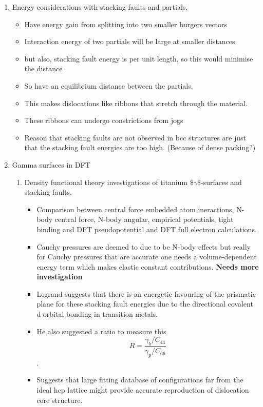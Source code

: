 \documentclass[11pt]{article}
\begin{document}
\begin{enumerate}
\item Energy considerations with stacking faults and partials.
\label{sec:orga72fca6}
\begin{itemize}
\item Have energy gain from splitting into two smaller burgers vectors
\item Interaction energy of two partials will be large at smaller distances
\item but also, stacking fault energy is per unit length, so this would
minimise the distance
\item So have an equilibrium distance between the partials.
\item This makes dislocations like ribbons that stretch through the material.
\item These ribbons can undergo constrictions from jogs
\item Reason that stacking faults are not observed in bcc structures are just
that the stacking fault energies are too high. (Because of dense packing?)
\end{itemize}
\item Gamma surfaces in DFT
\label{sec:org5c15c52}
\begin{enumerate}
\item{} Density functional theory investigations of titanium \$\(\gamma\)\$-surfaces and stacking faults.
\label{sec:org675bd39}
\begin{itemize}
\item Comparison between central force  embedded atom ineractions, N-body
central force, N-body angular, empirical potentials, tight binding and
DFT pseudopotential and DFT full electron calculations.
\item Cauchy pressures are deemed to due to be N-body effects but really for Cauchy
pressures that are accurate one needs a volume-dependent energy term
which makes elastic constant contributions. \textbf{\textbf{Needs more investigation}}
\item Legrand suggests that there is an energetic favouring of the prismatic
plane for these stacking fault energies due to the directional covalent
d-orbital bonding in transition metals.
\item He also suggested a ratio to measure this \[ R = \frac{\gamma_{b}/C_{44}}{\gamma_{p}/C_{66}} \].
\item Suggests that large fitting database of configurations far from the
ideal hcp lattice might provide accurate reproduction of dislocation
core structure.

\end{itemize}
\end{enumerate}
\end{enumerate}
\end{document}
